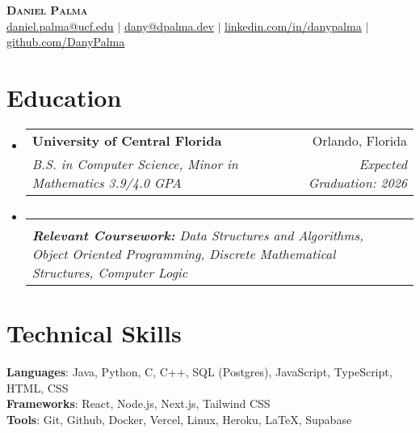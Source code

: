 \documentclass[letterpaper,11pt]{article}
\makeatletter
\newcommand{\resumeSubheading}[4]{
  \vspace{-2pt}\item
    \begin{tabular*}{0.97\textwidth}[t]{l@{\extracolsep{\fill}}r}
      \textbf{#1} & #2 \\
      \textit{\small#3} & \textit{\small #4} \\
    \end{tabular*}\vspace{-7pt}
}
\newcommand{\resumeSubHeadingListStart}{\begin{itemize}[leftmargin=0.15in, label={}]}
\newcommand{\resumeSubHeadingListEnd}{\end{itemize}}
\makeatother
\begin{document}

\begin{center}
    \textbf{\Huge \scshape Daniel Palma} \\ \vspace{1pt}
    \href{mailto:daniel.palma@ucf.edu}{\underline{daniel.palma@ucf.edu}} $|$ \href{mailto:dany@dpalma.dev}{\underline{dany@dpalma.dev}} $|$ 
    \href{https://linkedin.com/in/danypalma}{\underline{linkedin.com/in/danypalma}} $|$
    \href{https://github.com/DanyPalma}{\underline{github.com/DanyPalma}}
\end{center}


\section{Education}
  \resumeSubHeadingListStart
    \resumeSubheading
      {University of Central Florida}{Orlando, Florida}
      {B.S. in Computer Science, Minor in Mathematics 3.9/4.0 GPA}{Expected Graduation: 2026}
    
      \vspace{-15pt}
    \resumeSubheading
      {}{}
      {\scriptsize{\textbf{Relevant Coursework: }Data Structures and Algorithms, Object Oriented Programming, Discrete Mathematical Structures, Computer Logic}}{}
  \resumeSubHeadingListEnd


  
\section{Technical Skills}
\begin{itemize}[leftmargin=0.15in, label={}]
   \small{\item{
    \textbf{Languages}{: Java, Python, C, C++, SQL (Postgres), JavaScript, TypeScript, HTML, CSS} \\
    \textbf{Frameworks}{: React, Node.js, Next.js, Tailwind CSS} \\
    \textbf{Tools}{: Git, Github, Docker, Vercel, Linux, Heroku, LaTeX, Supabase} \\
   }}
\end{itemize}
\end{document}
